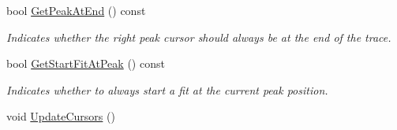\begin{DoxyCompactItemize}
bool \hyperlink{classwxStfCursorsDlg_ae1579db95062fd20394a498bfd3dc924}{GetPeakAtEnd} () const 
\begin{DoxyCompactList}\small\item\em Indicates whether the right peak cursor should always be at the end of the trace. \item\end{DoxyCompactList}\item 
bool \hyperlink{classwxStfCursorsDlg_aa6d011bfe921c1d038b720fb7c94a3ec}{GetStartFitAtPeak} () const 
\begin{DoxyCompactList}\small\item\em Indicates whether to always start a fit at the current peak position. \item\end{DoxyCompactList}\item 
\hypertarget{classwxStfCursorsDlg_a299bb15e4c37376c620e71dac269d6a5}{
void \hyperlink{classwxStfCursorsDlg_a299bb15e4c37376c620e71dac269d6a5}{UpdateCursors} ()}
\label{classwxStfCursorsDlg_a299bb15e4c37376c620e71dac269d6a5}


\end{DoxyCompactItemize}
